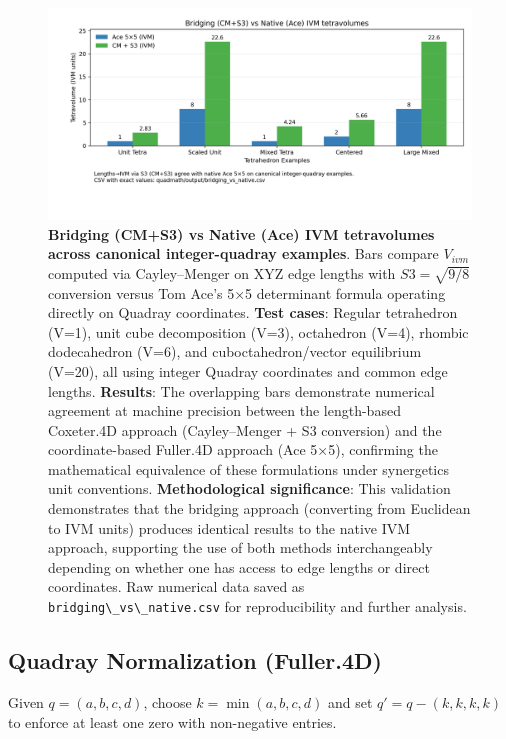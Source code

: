 \documentclass[
  10pt,
]{article}
\newcommand{\passthrough}[1]{#1}
\begin{document}
\begin{figure}
\centering
\includegraphics{../output/figures/bridging_vs_native.png}
\caption{\textbf{Bridging (CM+S3) vs Native (Ace) IVM tetravolumes
across canonical integer-quadray examples}. Bars compare \(V_{ivm}\)
computed via Cayley--Menger on XYZ edge lengths with \(S3=\sqrt{9/8}\)
conversion versus Tom Ace's 5×5 determinant formula operating directly
on Quadray coordinates. \textbf{Test cases}: Regular tetrahedron (V=1),
unit cube decomposition (V=3), octahedron (V=4), rhombic dodecahedron
(V=6), and cuboctahedron/vector equilibrium (V=20), all using integer
Quadray coordinates and common edge lengths. \textbf{Results}: The
overlapping bars demonstrate numerical agreement at machine precision
between the length-based Coxeter.4D approach (Cayley--Menger + S3
conversion) and the coordinate-based Fuller.4D approach (Ace 5×5),
confirming the mathematical equivalence of these formulations under
synergetics unit conventions. \textbf{Methodological significance}: This
validation demonstrates that the bridging approach (converting from
Euclidean to IVM units) produces identical results to the native IVM
approach, supporting the use of both methods interchangeably depending
on whether one has access to edge lengths or direct coordinates. Raw
numerical data saved as
\passthrough{\lstinline!bridging\_vs\_native.csv!} for reproducibility
and further analysis.}
\end{figure}

\hypertarget{quadray-normalization-fuller.4d}{%
\subsection{Quadray Normalization
(Fuller.4D)}\label{quadray-normalization-fuller.4d}}

Given \(q=(a,b,c,d)\), choose \(k=\min(a,b,c,d)\) and set
\(q' = q - (k,k,k,k)\) to enforce at least one zero with non-negative
entries.
\end{document}
